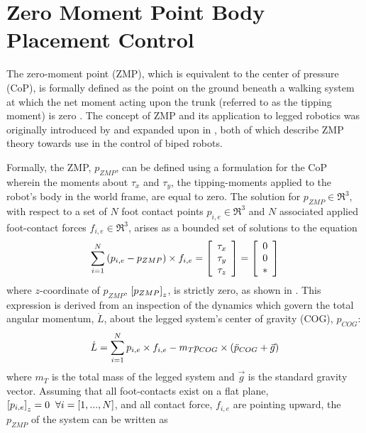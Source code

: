 		\section{Zero Moment Point Body Placement Control}

		The zero-moment point (ZMP), which is equivalent to the center of pressure (CoP), is formally defined as the point on the ground beneath a walking system at which the net moment acting upon the trunk (referred to as the tipping moment) is zero \cite{Sardain2004}. The concept of ZMP and its application to legged robotics was originally introduced by \cite{Vuko1972} and expanded upon in \cite{Goswami1999}, both of which describe ZMP theory towards use in the control of biped robots.

		Formally, the ZMP, $p_{ZMP}$, can be defined using a formulation for the CoP wherein the moments about $\tau_{x}$ and $\tau_{y}$, the tipping-moments applied to the robot's body in the world frame, are equal to zero. The solution for $p_{ZMP}\in\Re^{3}$, with respect to a set of $N$ foot contact points $p_{i,e}\in\Re^{3}$ and $N$ associated applied foot-contact forces $f_{i,e}\in\Re^{3}$, arises as a bounded set of solutions to the equation
			\begin{equation}
				\sum^{N}_{i=1}\left(p_{i,e}-p_{ZMP}\right)\times f_{i,e} 
				= 
				\left[
					\begin{array}{c}
						\tau_{x}	\\
						\tau_{y}	\\
						\tau_{z}
					\end{array}
				\right]
				=
				\left[
					\begin{array}{c}
						0			\\
						0			\\
						*
					\end{array}
				\right]
			\end{equation}
		where $z$-coordinate of $p_{ZMP}$, $\left[p_{ZMP}\right]_{z}$, is strictly zero, as shown in \cite{Wieber2015}. This expression is derived from an inspection of the dynamics which govern the total angular momentum, $\dot{L}$, about the legged system's center of gravity (COG), $p_{COG}$:
			\begin{equation}
				\dot{L} = \sum_{i=1}^{N} p_{i,e}\times f_{i,e} - m_{T} p_{COG} \times \left( \ddot{p}_{COG} + \vec{g} \right)
			\end{equation}
		where $m_{T}$ is the total mass of the legged system and $\vec{g}$ is the standard gravity vector. Assuming that all foot-contacts exist on a flat plane, \IE $\left[p_{i,e}\right]_{z}=0\hspace{2mm} \forall i=[1,...,N]$, and all contact force, $f_{i,e}$ are pointing upward, the $p_{ZMP}$ of the system can be written as
